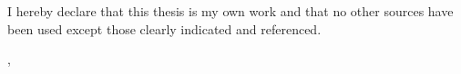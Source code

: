 \thispagestyle{empty}
\vspace*{0.8\textheight}
\noindent
I hereby declare that this thesis is my own work and that no other sources have been used except those clearly indicated and referenced. %

\vspace{15mm}
\noindent
\getSubmissionLocationTUM{}, \getSubmissionDate{} \hspace{5cm} \getAuthor{}

\cleardoublepage{}
